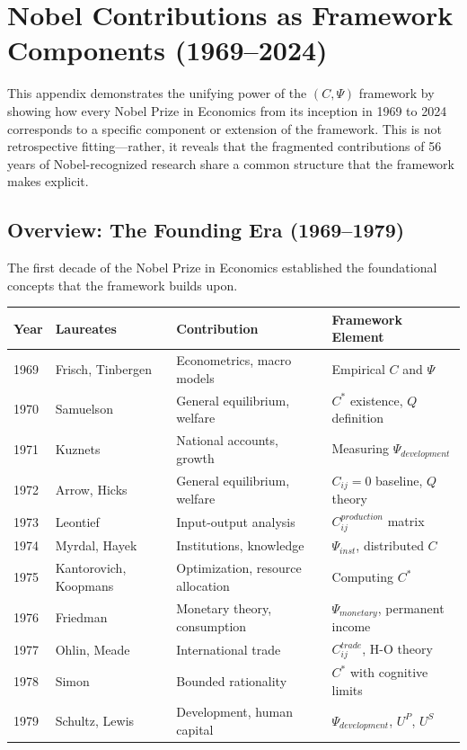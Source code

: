 \section{Nobel Contributions as Framework Components (1969--2024)}
\label{app:nobel}

This appendix demonstrates the unifying power of the $(C, \Psi)$ framework
by showing how every Nobel Prize in Economics from its inception in 1969 to 2024 
corresponds to a specific component or extension of the framework.
This is not retrospective fitting---rather, it reveals that the fragmented
contributions of 56 years of Nobel-recognized research share a common structure
that the framework makes explicit.

\subsection{Overview: The Founding Era (1969--1979)}

The first decade of the Nobel Prize in Economics established the foundational
concepts that the framework builds upon.

\begin{center}
\renewcommand{\arraystretch}{1.15}
\small
\begin{tabular}{llll}
\hline
\textbf{Year} & \textbf{Laureates} & \textbf{Contribution} & \textbf{Framework Element} \\
\hline
1969 & Frisch, Tinbergen & Econometrics, macro models & Empirical $C$ and $\Psi$ \\
1970 & Samuelson & General equilibrium, welfare & $C^*$ existence, $Q$ definition \\
1971 & Kuznets & National accounts, growth & Measuring $\Psi_{development}$ \\
1972 & Arrow, Hicks & General equilibrium, welfare & $C_{ij} = 0$ baseline, $Q$ theory \\
1973 & Leontief & Input-output analysis & $C^{production}_{ij}$ matrix \\
1974 & Myrdal, Hayek & Institutions, knowledge & $\Psi_{inst}$, distributed $C$ \\
1975 & Kantorovich, Koopmans & Optimization, resource allocation & Computing $C^*$ \\
1976 & Friedman & Monetary theory, consumption & $\Psi_{monetary}$, permanent income \\
1977 & Ohlin, Meade & International trade & $C^{trade}_{ij}$, H-O theory \\
1978 & Simon & Bounded rationality & $C^*$ with cognitive limits \\
1979 & Schultz, Lewis & Development, human capital & $\Psi_{development}$, $U^P$, $U^S$ \\
\hline
\end{tabular}
\end{center}

